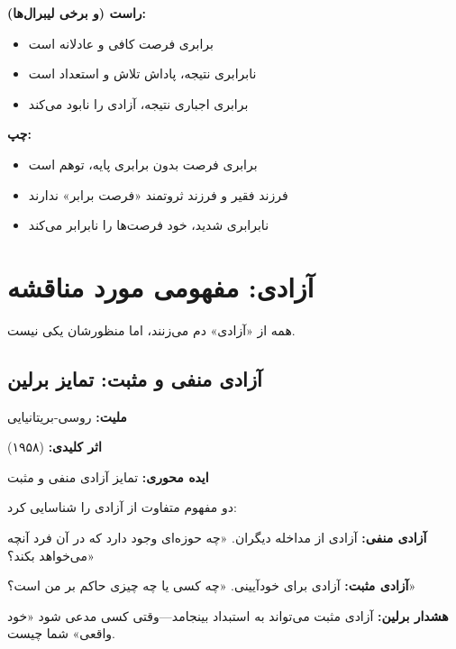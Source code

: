 \begin{debatebox}
	\textbf{راست (و برخی لیبرال‌ها):}
	\begin{itemize}[nosep]
		\item برابری فرصت کافی و عادلانه است
		\item نابرابری نتیجه، پاداش تلاش و استعداد است
		\item برابری اجباری نتیجه، آزادی را نابود می‌کند
	\end{itemize}
	
	\textbf{چپ:}
	\begin{itemize}[nosep]
		\item برابری فرصت بدون برابری پایه، توهم است
		\item فرزند فقیر و فرزند ثروتمند «فرصت برابر» ندارند
		\item نابرابری شدید، خود فرصت‌ها را نابرابر می‌کند
	\end{itemize}
\end{debatebox}

\section{آزادی: مفهومی مورد مناقشه}

همه از «آزادی» دم می‌زنند، اما منظورشان یکی نیست.

\subsection{آزادی منفی و مثبت: تمایز برلین}

\begin{personbox}
	
	\textbf{ملیت:} روسی-بریتانیایی
	
	\textbf{اثر کلیدی:}  (۱۹۵۸)
	
	\textbf{ایده محوری:} تمایز آزادی منفی و مثبت
	
	\mediumspace
	
	 دو مفهوم متفاوت از آزادی را شناسایی کرد:
	
	\textbf{آزادی منفی:} آزادی از مداخله دیگران. «چه حوزه‌ای وجود دارد که در آن فرد آنچه می‌خواهد بکند؟»
	
	\textbf{آزادی مثبت:} آزادی برای خودآیینی. «چه کسی یا چه چیزی حاکم بر من است؟»
	
	\mediumspace
	
	\textbf{هشدار برلین:} آزادی مثبت می‌تواند به استبداد بینجامد—وقتی کسی مدعی شود «خود واقعی» شما چیست.
\end{personbox}

